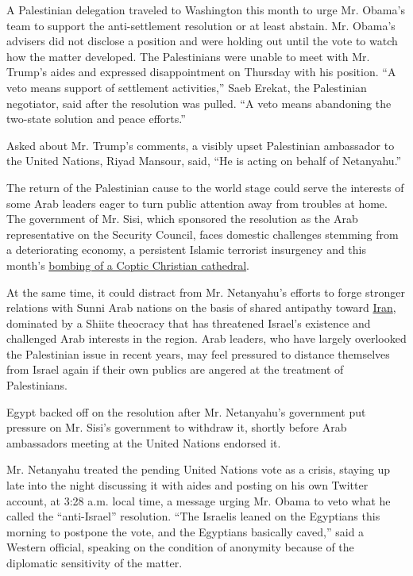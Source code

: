 A Palestinian delegation traveled to Washington this month to urge Mr.
Obama's team to support the anti-settlement resolution or at least
abstain. Mr. Obama's advisers did not disclose a position and were
holding out until the vote to watch how the matter developed. The
Palestinians were unable to meet with Mr. Trump's aides and expressed
disappointment on Thursday with his position. ``A veto means support of
settlement activities,'' Saeb Erekat, the Palestinian negotiator, said
after the resolution was pulled. ``A veto means abandoning the two-state
solution and peace efforts.''

Asked about Mr. Trump's comments, a visibly upset Palestinian ambassador
to the United Nations, Riyad Mansour, said, ``He is acting on behalf of
Netanyahu.''

The return of the Palestinian cause to the world stage could serve the
interests of some Arab leaders eager to turn public attention away from
troubles at home. The government of Mr. Sisi, which sponsored the
resolution as the Arab representative on the Security Council, faces
domestic challenges stemming from a deteriorating economy, a persistent
Islamic terrorist insurgency and this month's
\href{http://www.nytimes.com/2016/12/11/world/middleeast/cairo-coptic-cathedral-attack.html?ref=world\&_r=0}{bombing
of a Coptic Christian cathedral}.

At the same time, it could distract from Mr. Netanyahu's efforts to
forge stronger relations with Sunni Arab nations on the basis of shared
antipathy toward
\href{http://www.nytimes.com/topic/destination/iran}{Iran}, dominated by
a Shiite theocracy that has threatened Israel's existence and challenged
Arab interests in the region. Arab leaders, who have largely overlooked
the Palestinian issue in recent years, may feel pressured to distance
themselves from Israel again if their own publics are angered at the
treatment of Palestinians.

Egypt backed off on the resolution after Mr. Netanyahu's government put
pressure on Mr. Sisi's government to withdraw it, shortly before Arab
ambassadors meeting at the United Nations endorsed it.

Mr. Netanyahu treated the pending United Nations vote as a crisis,
staying up late into the night discussing it with aides and posting on
his own Twitter account, at 3:28 a.m. local time, a message urging Mr.
Obama to veto what he called the ``anti-Israel'' resolution. ``The
Israelis leaned on the Egyptians this morning to postpone the vote, and
the Egyptians basically caved,'' said a Western official, speaking on
the condition of anonymity because of the diplomatic sensitivity of the
matter.

